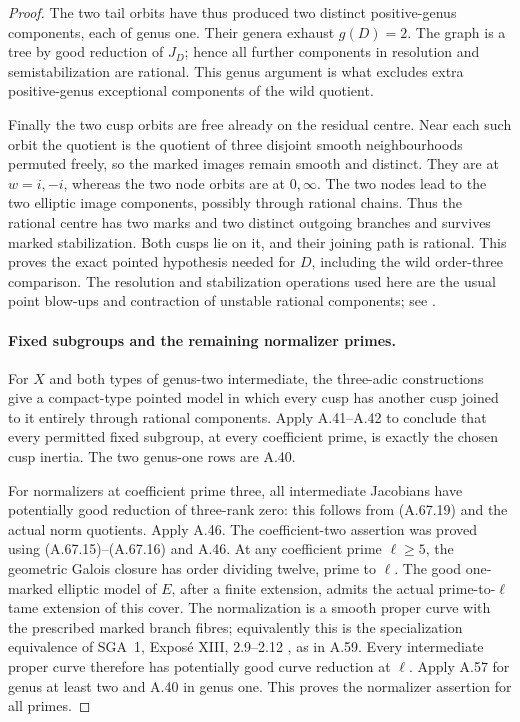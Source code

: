 \begin{proof}
The two tail orbits have thus produced two distinct
positive-genus components, each of genus one. Their genera
exhaust \(g(D)=2\). The graph is a tree by good reduction of
\(J_D\); hence all further components in resolution and
semistabilization are rational. This genus argument is what
excludes extra positive-genus exceptional components of the
wild quotient.

Finally the two cusp orbits are free already on the residual
centre. Near each such orbit the quotient is the quotient of
three disjoint smooth neighbourhoods permuted freely, so the
marked images remain smooth and distinct. They are at
\(w=i,-i\), whereas the two node orbits are at \(0,\infty\).
The two nodes lead to the two elliptic image components,
possibly through rational chains. Thus the rational centre
has two marks and two distinct outgoing branches and survives
marked stabilization. Both cusps lie on it, and their joining
path is rational. This proves the exact pointed hypothesis
needed for \(D\), including the wild order-three comparison.
The resolution and stabilization operations used here are
the usual point blow-ups and contraction of unstable rational
components; see \cite[9.2.5, 9.2.7, 10.4.24]{fghLiu}.

\paragraph{Fixed subgroups and the remaining normalizer primes.}
For \(X\) and both types of genus-two intermediate, the
three-adic constructions give a compact-type pointed model
in which every cusp has another cusp joined to it entirely
through rational components. Apply A.41--A.42 to conclude
that every permitted fixed subgroup, at every coefficient
prime, is exactly the chosen cusp inertia. The two
genus-one rows are A.40.

For normalizers at coefficient prime three, all intermediate
Jacobians have potentially good reduction of three-rank zero:
this follows from (A.67.19) and the actual norm quotients.
Apply A.46. The coefficient-two assertion was proved using
(A.67.15)--(A.67.16) and A.46. At any coefficient prime
\(\ell\ge5\), the geometric Galois closure has order dividing
twelve, prime to \(\ell\). The good one-marked elliptic model
of \(E\), after a finite extension, admits the actual
prime-to-\(\ell\) tame extension of this cover. The
normalization is a smooth proper curve with the prescribed
marked branch fibres; equivalently this is the specialization
equivalence of SGA~1, Expos\'e XIII, 2.9--2.12
\cite{fghSGA1}, as in A.59. Every intermediate proper curve
therefore has potentially good curve reduction at \(\ell\).
Apply A.57 for genus at least two and A.40 in genus one.
This proves the normalizer assertion for all primes.


\end{proof}
